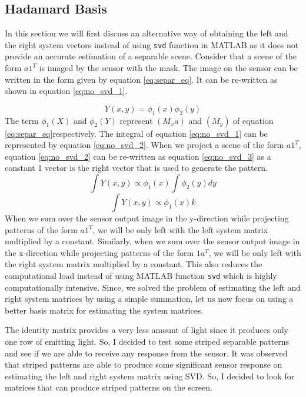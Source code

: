 \subsection{Hadamard Basis}
In this section we will first discuss an alternative way of obtaining the left and the right system vectors instead of using \texttt{svd} function in MATLAB as it does not provide an accurate estimation of a separable scene. Consider that a scene of the form $a1^T$ is imaged by the sensor with the mask. The image on the sensor can be written in the form given by equation \ref{eq:separ_eq}. It can be re-written as shown in equation \ref{eq:no_svd_1}.

\begin{equation}
Y(x,y) = \phi_1(x)\phi_2(y)
\label{eq:no_svd_1}
\end{equation}
The term $\phi_1(X)$ and $\phi_2(Y)$ represent $(M_xa)$ and $(M_y)$ of equation \ref{eq:separ_eq}respectively. The integral of equation \ref{eq:no_svd_1} can be represented by equation \ref{eq:no_svd_2}. When we project a scene of the form $a1^T$, equation \ref{eq:no_svd_2} can be re-written as equation \ref{eq:no_svd_3} as a constant 1 vector is the right vector that is used to generate the pattern.
\begin{equation}
\int Y(x,y) \propto \phi_1(x)\int \phi_2(y)dy
\label{eq:no_svd_2}
\end{equation}
\begin{equation}
\int Y(x,y) \propto \phi_1(x) k
\label{eq:no_svd_3}
\end{equation}
When we sum over the sensor output image in the y-direction while projecting  patterns of the  form $a1^T$, we will be only left with the left system matrix multiplied by a constant. Similarly, when we sum over the sensor output image in the x-direction while projecting  patterns of the  form $1a^T$, we will be only left with the right system matrix multiplied by a constant. This also reduces the computational load instead of using MATLAB function \texttt{svd} which is highly computationally intensive. Since, we solved the problem of estimating the left and right system matrices by using a simple summation, let us now focus on using a better basis matrix for estimating the system matrices. 

The identity matrix provides a very less amount of light since it produces only one row of emitting light. So, I decided to test some striped separable patterns and see if we are able to receive any response from the sensor. It was observed that striped patterns are able to produce some significant sensor response on estimating the left and right system matrix using SVD. So, I decided to look for matrices that can produce striped patterns on the screen. 

